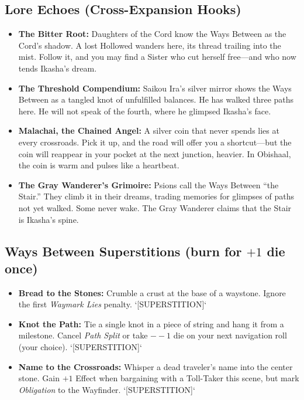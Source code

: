 \subsection*{Lore Echoes (Cross-Expansion Hooks)}
\begin{itemize}
  \item \textbf{The Bitter Root:} Daughters of the Cord know the Ways Between as the Cord's shadow. A lost Hollowed wanders here, its thread trailing into the mist. Follow it, and you may find a Sister who cut herself free---and who now tends Ikasha's dream.
  \item \textbf{The Threshold Compendium:} Saikou Ira's silver mirror shows the Ways Between as a tangled knot of unfulfilled balances. He has walked three paths here. He will not speak of the fourth, where he glimpsed Ikasha's face.
  \item \textbf{Malachai, the Chained Angel:} A silver coin that never spends lies at every crossroads. Pick it up, and the road will offer you a shortcut---but the coin will reappear in your pocket at the next junction, heavier. In Obishaal, the coin is warm and pulses like a heartbeat.
  \item \textbf{The Gray Wanderer's Grimoire:} Psions call the Ways Between ``the Stair.'' They climb it in their dreams, trading memories for glimpses of paths not yet walked. Some never wake. The Gray Wanderer claims that the Stair is Ikasha's spine.
\end{itemize}

\subsection*{Ways Between Superstitions (burn for $+1$ die once)}
\begin{itemize}
  \item \textbf{Bread to the Stones:} Crumble a crust at the base of a waystone. Ignore the first \emph{Waymark Lies} penalty. `[SUPERSTITION]`
  \item \textbf{Knot the Path:} Tie a single knot in a piece of string and hang it from a milestone. Cancel \emph{Path Split} or take $--1$ die on your next navigation roll (your choice). `[SUPERSTITION]`
  \item \textbf{Name to the Crossroads:} Whisper a dead traveler's name into the center stone. Gain $+1$ Effect when bargaining with a Toll-Taker this scene, but mark \emph{Obligation} to the Wayfinder. `[SUPERSTITION]`
\end{itemize}

